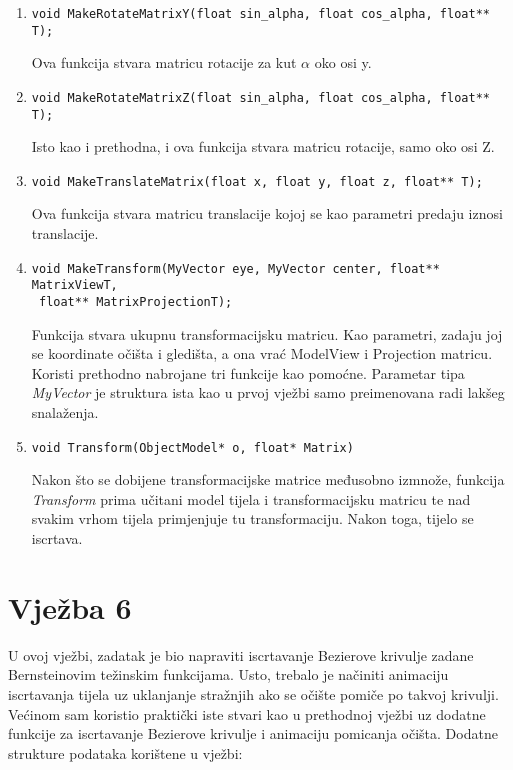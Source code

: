 \documentclass[utf8]{fer}
\begin{document}
\begin{enumerate}
\item \begin{lstlisting}
void MakeRotateMatrixY(float sin_alpha, float cos_alpha, float** T);
\end{lstlisting}
Ova funkcija stvara matricu rotacije za kut $\alpha$ oko osi y.

\item \begin{lstlisting}
void MakeRotateMatrixZ(float sin_alpha, float cos_alpha, float** T);
\end{lstlisting}
Isto kao i prethodna, i ova funkcija stvara matricu rotacije, samo oko osi Z.

\item \begin{lstlisting}
void MakeTranslateMatrix(float x, float y, float z, float** T);
\end{lstlisting}

Ova funkcija stvara matricu translacije kojoj se kao parametri predaju iznosi translacije.

\item \begin{lstlisting}
void MakeTransform(MyVector eye, MyVector center, float** MatrixViewT,
 float** MatrixProjectionT);
\end{lstlisting}

Funkcija stvara ukupnu transformacijsku matricu. Kao parametri, zadaju joj se koordinate očišta i gledišta, a ona vrać ModelView i Projection matricu. Koristi prethodno nabrojane tri funkcije kao pomoćne. Parametar tipa \textit{MyVector} je struktura ista kao u prvoj vježbi samo preimenovana radi lakšeg snalaženja.
\newline
\item \begin{lstlisting}
void Transform(ObjectModel* o, float* Matrix)
\end{lstlisting}

Nakon što se dobijene transformacijske matrice međusobno izmnože, funkcija \textit{Transform} prima učitani model tijela i transformacijsku matricu te nad svakim vrhom tijela primjenjuje tu transformaciju. Nakon toga, tijelo se iscrtava.


\end{enumerate}

\section{Vježba 6}
U ovoj vježbi, zadatak je bio napraviti iscrtavanje Bezierove krivulje zadane Bernsteinovim težinskim funkcijama. Usto, trebalo je načiniti animaciju iscrtavanja tijela uz uklanjanje stražnjih ako se očište pomiče po takvoj krivulji. Većinom sam koristio praktički iste stvari kao u prethodnoj vježbi uz dodatne funkcije za iscrtavanje Bezierove krivulje i animaciju pomicanja očišta. Dodatne strukture podataka korištene u vježbi:
\end{document}

